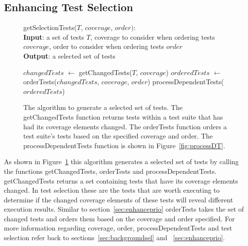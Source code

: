 \subsection{Enhancing Test Selection}
\label{sec:enhancesel}
\begin{figure}[t]
	getSelectionTests($\mathit{T}$, $\mathit{coverage}$, $\mathit{order}):$\\
	\textbf{Input}: a set of tests $\mathit{T}$, coverage to consider when ordering
	tests $\mathit{coverage}$, order to consider when ordering tests $\mathit{order}$\\
	\textbf{Output}: a selected set of tests\\
	 \begin{algorithmic}[1]
	 	\vspace{-5mm}
	 	\STATE $\mathit{changedTests}$ $\leftarrow$ getChangedTests($\mathit{T}$,
	 	$\mathit{coverage}$)
		\STATE $\mathit{orderedTests}$ $\leftarrow$ orderTests($\mathit{changedTests}$,
		$\mathit{coverage}$, $\mathit{order}$)
		\RETURN processDependentTests($\mathit{orderedTests}$)
	\end{algorithmic}
	\vspace{-3mm}
	\caption {
		The algorithm to generate a selected set of tests. The
		getChangedTests function returns tests within a test suite that has had its
		coverage elements changed. The orderTests function orders a test suite's tests
		based on the specified coverage and order. The processDependentTests function
		is shown in Figure~\ref{fig:processDT}. 
	}
	\label{fig:selection}
\end{figure}
As shown in Figure~\ref{fig:selection} this algorithm generates a selected
set of tests by calling the functions getChangedTests, orderTests and
processDependentTests. getChangedTests returns a set containing tests
that have its coverage elements changed. In test selection these are the tests
that are worth executing to determine if the changed coverage elements of these
tests will reveal different execution results. Similar to section~\ref{sec:enhanceprio}
orderTests takes the set of changed tests and orders them based on the coverage
and order specified. For more information regarding coverage, order,
processDependentTests and test selection refer back to sections~\ref{sec:backgroundsel}
and ~\ref{sec:enhanceprio}.

